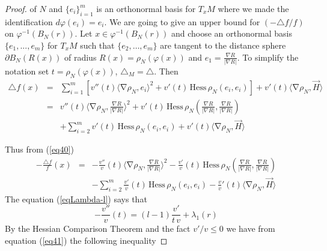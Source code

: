 \documentclass[a4paper]{amsart}
\theoremstyle{definition}
\numberwithin{equation}{section}
\begin{document}
\begin{proof}
 of $N$ and $\{e_{i}\}_{i=1}^{m}$ is an orthonormal basis for $T_{x}M$ where
 we made the identification $d\varphi(e_{i})=e_{i}$. We are going to give an upper bound for $(-\triangle f/f)$ on $\varphi^{-1}(B_{N}(r))$.
Let $x\in \varphi^{-1}(B_{N}(r)) $ and choose an orthonormal basis $\{e_1,...,e_m\} $ for $T_{x}M$ such that $\{e_{2},\ldots, e_{m}\}$ are tangent to the distance sphere $\partial B_{N}(R(x))$ of radius $R(x)=\rho_{N} (\varphi (x))$ and $e_{1}=\frac{\nabla R}{\vert \nabla R\vert}$. To simplify the notation set $t=\rho_{N}(\varphi(x))$, $\triangle_{M}=\triangle$. Then
\begin{eqnarray}\label{eq40}
\triangle f(x)&=&\displaystyle\sum_{i=1}^{m}\left[{v}''(t)\langle {\operatorname{\nabla}} \rho_{N}, e_{i}\rangle^{2} +v'(t)\,{\textrm{Hess}}\,\rho_{N} (e_i,e_i)\right]+ v'( t)\langle {\operatorname{\nabla}} \rho_{N},\vec H\rangle\nonumber \\
&=&{v}''(t)\langle {\operatorname{\nabla}} \rho_{N}, \frac{\nabla R}{\vert \nabla R\vert}\rangle^{2}+v'(t)\,{\textrm{Hess}}\,\rho_{N} (\frac{\nabla R}{\vert \nabla R\vert},\frac{\nabla R}{\vert \nabla R\vert}) \\
&&+\displaystyle\sum_{i=2}^{m}v'(t)\,{\textrm{Hess}}\,\rho_{N} (e_i,e_i)+ v'( t)\langle {\operatorname{\nabla}}\rho_{N},\vec H\rangle\nonumber
\end{eqnarray}

Thus from (\ref{eq40})
\begin{eqnarray}\label{eq41}-\frac{\triangle f}{f}(x)&=&-\frac{v''}{v}(t)\langle {\operatorname{\nabla}} \rho_{N}, \frac{\nabla R}{\vert \nabla R\vert}\rangle^{2}-\frac{v'}{v}(t)\,{\textrm{Hess}}\,\rho_{N} (\frac{\nabla R}{\vert \nabla R\vert},\frac{\nabla R}{\vert \nabla R\vert}) \\
&&-\displaystyle\sum_{i=2}^{m}\frac{v'}{v}(t)\,{\textrm{Hess}}\,\rho_{N} (e_i,e_i)-\frac{ v}{v}'( t)\langle {\operatorname{\nabla}}\rho_{N},\vec H\rangle\nonumber
\end{eqnarray}
The equation (\ref{eqLambda-l})  says that \[ -\frac{v''}{v}(t)=(l-1)\frac{v'}{t\, v}+ \lambda_{1}(r)\]
By the Hessian Comparison Theorem and the fact $v'/v\leq 0$ we have  from equation (\ref{eq41}) the following inequality


\end{proof}
\end{document}
